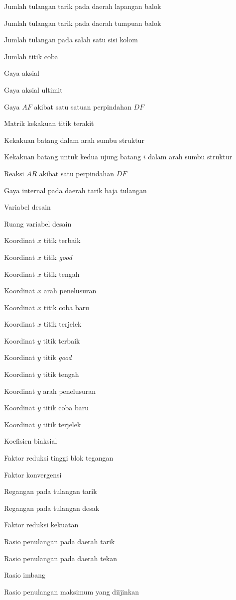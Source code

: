 \begin{description}[style=nextline,leftmargin=2.2cm,labelwidth=2cm]
\item[$ntltrlp$] Jumlah tulangan tarik pada daerah lapangan balok
\item[$ntltrtm$] Jumlah tulangan tarik pada daerah tumpuan balok
\item[$N$] Jumlah tulangan pada salah satu sisi kolom
\item[$Ntitik$] Jumlah titik coba
\item[$P$] Gaya aksial
\item[$P_u$] Gaya aksial ultimit
\item[$SFF$] Gaya $AF$ akibat satu satuan perpindahan $DF$
\item[$SJ$] Matrik kekakuan titik terakit
\item[$SM$] Kekakuan batang dalam arah sumbu struktur
\item[$SMS_i$] Kekakuan batang untuk kedua ujung batang $i$ dalam arah sumbu struktur
\item[$SRF$] Reaksi $AR$ akibat satu perpindahan $DF$
\item[$T$] Gaya internal pada daerah tarik baja tulangan
\item[$x$] Variabel desain
\item[$X$] Ruang variabel desain
\item[$X_B$] Koordinat $x$ titik terbaik
\item[$X_G$] Koordinat $x$ titik \textit{good}
\item[$X_M$] Koordinat $x$ titik tengah
\item[$X_S$] Koordinat $x$ arah penelusuran
\item[$X_T$] Koordinat $x$ titik coba baru
\item[$X_W$] Koordinat $x$ titik terjelek
\item[$Y_B$] Koordinat $y$ titik terbaik
\item[$Y_G$] Koordinat $y$ titik \textit{good}
\item[$Y_M$] Koordinat $y$ titik tengah
\item[$Y_S$] Koordinat $y$ arah penelusuran
\item[$Y_T$] Koordinat $y$ titik coba baru
\item[$Y_W$] Koordinat $y$ titik terjelek
\item[$\alpha$] Koefisien biaksial
\item[$\beta_1$] Faktor reduksi tinggi blok tegangan
\item[$\varepsilon$] Faktor konvergensi
\item[$\varepsilon_s$] Regangan pada tulangan tarik
\item[$\varepsilon_s'$] Regangan pada tulangan desak
\item[$\phi$] Faktor reduksi kekuatan
\item[$\rho$] Rasio penulangan pada daerah tarik
\item[$\rho'$] Rasio penulangan pada daerah tekan
\item[$\rho_b$] Rasio imbang
\item[$\rho_{maks}$] Rasio penulangan maksimum yang diijinkan
\end{description}

\clearpage

